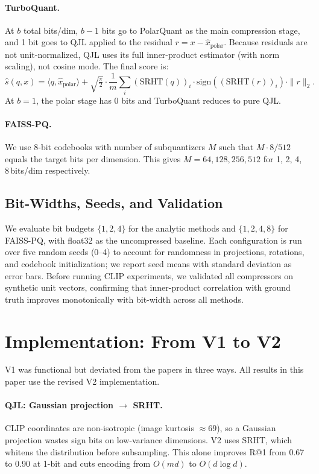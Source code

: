 \documentclass[11pt]{article}
\begin{document}
\paragraph{TurboQuant.}
At $b$ total bits/dim, $b-1$ bits go to PolarQuant as the main compression stage, and 1 bit goes to QJL
applied to the residual $r = x - \hat{x}_{\text{polar}}$. Because residuals are not unit-normalized,
QJL uses its full inner-product estimator (with norm scaling), not cosine mode. The final score is:
\[
    \hat{s}(q, x) = \langle q, \hat{x}_{\text{polar}} \rangle + \sqrt{\tfrac{\pi}{2}} \cdot \frac{1}{m}
    \sum_i (\mathrm{SRHT}(q))_i \cdot \mathrm{sign}((\mathrm{SRHT}(r))_i) \cdot \|r\|_2.
\]
At $b=1$, the polar stage has 0 bits and TurboQuant reduces to pure QJL.

\paragraph{FAISS-PQ.}
We use 8-bit codebooks with number of subquantizers $M$ such that $M \cdot 8 / 512$ equals the target
bits per dimension. This gives $M = 64, 128, 256, 512$ for 1, 2, 4, 8\,bits/dim respectively.

\subsection{Bit-Widths, Seeds, and Validation}

We evaluate bit budgets $\{1, 2, 4\}$ for the analytic methods and $\{1, 2, 4, 8\}$ for FAISS-PQ, with
float32 as the uncompressed baseline. Each configuration is run over five random seeds (0--4) to account
for randomness in projections, rotations, and codebook initialization; we report seed means with standard
deviation as error bars. Before running CLIP experiments, we validated all compressors on synthetic unit
vectors, confirming that inner-product correlation with ground truth improves monotonically with
bit-width across all methods.

\section{Implementation: From V1 to V2}
\label{sec:v1v2}

V1 was functional but deviated from the papers in three ways. All results in this paper use the
revised V2 implementation.

\paragraph{QJL: Gaussian projection $\to$ SRHT.}
CLIP coordinates are non-isotropic (image kurtosis $\approx 69$), so a Gaussian projection wastes
sign bits on low-variance dimensions. V2 uses SRHT, which whitens the distribution before subsampling.
This alone improves R@1 from 0.67 to 0.90 at 1-bit and cuts encoding from $O(md)$ to $O(d\log d)$.
\end{document}
